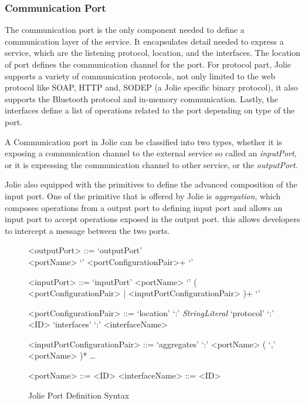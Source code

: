 \subsubsection{Communication Port}

The communication port is the only component needed to define a communication layer of the service.
It encapsulates detail needed to express a service, which are the listening protocol, location, and the interfaces. The location of port defines the communication channel for the port. For protocol part, Jolie supports a variety of communication protocols, not only limited to the web protocol like SOAP, HTTP and, SODEP (a Jolie specific binary protocol), it also supports the Bluetooth protocol and in-memory communication. Lastly, the interfaces define a list of operations related to the port depending on type of the port.

A Communication port in Jolie can be classified into two types, whether it is exposing a communication channel to the external service so called an \textit{inputPort}, or it is expressing the communication channel to other service, or the \textit{outputPort}.

Jolie also equipped with the primitives to define the advanced composition of the input port. One of the primitive that is offered by Jolie is \textit{aggregation}, which composes operations from a output port to defining input port and allows an input port to accept operations exposed in the output port. this allows developers to intercept a message between the two ports.

\begin{figure}[ht]
    \begin{framed}
        \begin{grammar}

            <outputPort> ::= `outputPort' \\ <portName> `{' <portConfigurationPair>+ `}'

            <inputPort>
            ::= `inputPort' <portName> `{' ( <portConfigurationPair> | <inputPortConfigurationPair> )+ `}'

            <portConfigurationPair>
            ::= `location' `:' \textit{StringLiteral}
            \alt `protocol' `:' <ID>
            \alt `interfaces' `:' <interfaceName>

            <inputPortConfigurationPair>
            ::=  `aggregates' `:' <portName> ( `,' <portName> )* \alt \dots

            <portName> ::= <ID>
            <interfaceName> ::= <ID>

        \end{grammar}
    \end{framed}
    \caption{Jolie Port Definition Syntax}
\end{figure}


